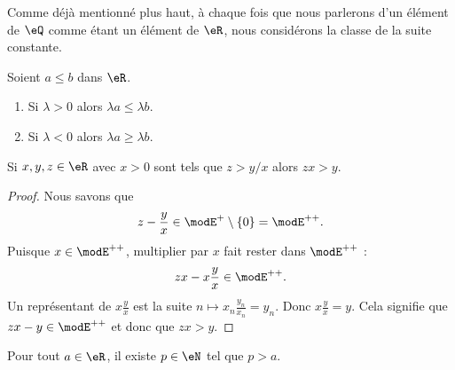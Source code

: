 \begin{remark}
	Comme déjà mentionné plus haut, à chaque fois que nous parlerons d'un élément de \( \eQ\) comme étant un élément de \( \eR\), nous considérons la classe de la suite constante.
\end{remark}

\begin{proposition}	\label{PROPooWYPNooCcBERG}
	Soient \( a\leq b\) dans \( \eR\).
	\begin{enumerate}
		\item		\label{ITEMooDCOXooAKcSKk}
		      Si \( \lambda>0\) alors \( \lambda a\leq \lambda b\).
		\item
		      Si \( \lambda <0\) alors \( \lambda a\geq \lambda b\).
	\end{enumerate}
\end{proposition}


\begin{lemma}       \label{LemooYNOVooOwoRwD}
	Si \( x,y,z\in \eR\) avec \( x>0\) sont tels que \( z>y/x\) alors \( zx>y\).
\end{lemma}

\begin{proof}
	Nous savons que
	\begin{equation}
		z-\frac{ y }{ x }\in \modE^+\setminus\{ 0 \}=\modE^{++}.
	\end{equation}
	Puisque \( x\in\modE^{++}\), multiplier par \( x\) fait rester dans \( \modE^{++}\) :
	\begin{equation}
		zx-x\frac{ y }{ x }\in \modE^{++}.
	\end{equation}
	Un représentant de \( x\frac{ y }{ x }\) est la suite \( n\mapsto x_n\frac{ y_n }{ x_n }=y_n\). Donc \( x\frac{ y }{ x }=y\). Cela signifie que \( zx-y\in\modE^{++}\) et donc que \( zx>y\).
\end{proof}

\begin{lemma}       \label{LemooMWOUooVWgaEi}
	Pour tout \( a\in \eR\), il existe \( p\in \eN\) tel que \( p>a\).
\end{lemma}

